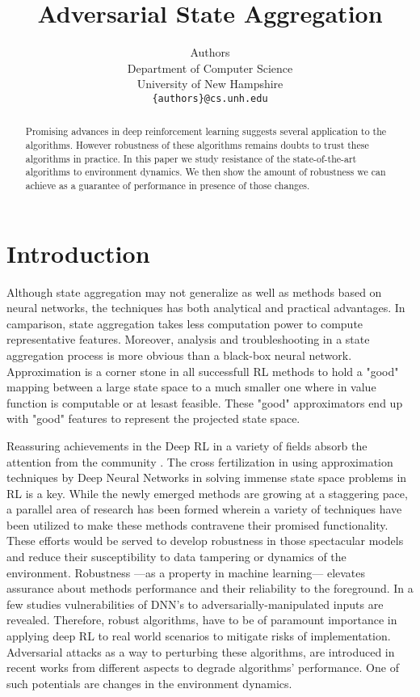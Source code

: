 \documentclass{article}
\title{Adversarial State Aggregation}
\author{%
Authors \\ %
Department of Computer Science\\
University of New Hampshire \\
\texttt{\{authors\}@cs.unh.edu} \\
}
\begin{document}
    \maketitle

    \begin{abstract}
        Promising advances in deep reinforcement learning suggests several application to the algorithms. However
        robustness of these algorithms remains doubts to trust these algorithms in practice. In this paper we study
        resistance of the state-of-the-art algorithms to environment dynamics. We then show the amount of robustness
        we can achieve as a guarantee of performance in presence of those changes.
    \end{abstract}


    \section{Introduction}
    Although state aggregation may not generalize as well as methods based on neural networks, the techniques has
    both analytical and practical advantages. In camparison, state aggregation takes less computation power to
    compute representative features. Moreover, analysis and troubleshooting in a state aggregation process is more
    obvious than a black-box neural network. Approximation is a corner stone in all successfull RL methods to hold a
    "good" mapping between a large state space to a much smaller one where in value function is computable or at
    lesast feasible. These "good" approximators end up with "good" features to represent the projected state space.

    Reassuring achievements in the Deep RL in a variety of fields absorb the attention from the community
    \citep{Mnih2015, Schulman2015TrustOptimization, Lillicrap2015ContinuousDDPG, silver2016a}. The cross
    fertilization in using approximation techniques by Deep Neural Networks in solving immense state space problems
    in RL is a key. While the newly emerged methods are growing at a staggering pace, a parallel area of research
    has been formed wherein a variety of techniques have been utilized to make these methods contravene their
    promised functionality. These efforts would be served to develop robustness in those spectacular models and
    reduce their susceptibility to data tampering or dynamics of the environment. Robustness ---as a property in
    machine learning--- elevates assurance about methods performance and their reliability to the foreground. In a
    few studies \cite{Goodfellow2014}  vulnerabilities of DNN's to adversarially-manipulated inputs are revealed.
    Therefore, robust algorithms, have to be of paramount importance in applying deep RL to real world scenarios to
    mitigate risks of implementation. Adversarial attacks as a way to perturbing these algorithms, are introduced in
    recent works \cite{Huang2017, Kos2017} from different aspects to degrade algorithms' performance. One of such
    potentials are changes in the environment dynamics.
\end{document}
